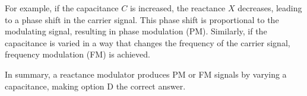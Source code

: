For example, if the capacitance \( C \) is increased, the reactance \( X \) decreases, leading to a phase shift in the carrier signal. This phase shift is proportional to the modulating signal, resulting in phase modulation (PM). Similarly, if the capacitance is varied in a way that changes the frequency of the carrier signal, frequency modulation (FM) is achieved.

In summary, a reactance modulator produces PM or FM signals by varying a capacitance, making option D the correct answer.

